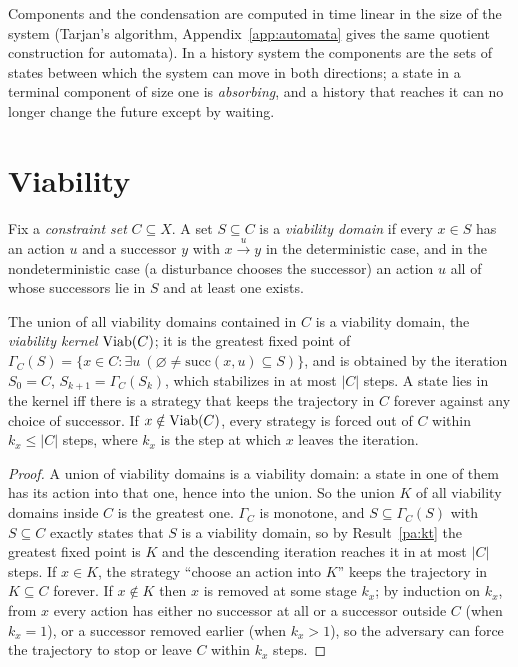 Components and the condensation are computed in time linear in the size of the system (Tarjan's algorithm, Appendix~\ref{app:automata} gives the same quotient construction for automata). In a history system the components are the sets of states between which the system can move in both directions; a state in a terminal component of size one is \emph{absorbing}, and a history that reaches it can no longer change the future except by waiting.

\section{Viability}

Fix a \emph{constraint set} $C\subseteq X$. A set $S\subseteq C$ is a \emph{viability domain} if every $x\in S$ has an action $u$ and a successor $y$ with $x\xrightarrow{u}y$ in the deterministic case, and in the nondeterministic case (a disturbance chooses the successor) an action $u$ all of whose successors lie in $S$ and at least one exists.

\begin{newresult}\label{pr:kernel}
The union of all viability domains contained in $C$ is a viability domain, the \emph{viability kernel} $\operatorname{Viab}(C)$; it is the greatest fixed point of $\Gamma_C(S)=\{x\in C:\exists u\ (\varnothing\ne\mathrm{succ}(x,u)\subseteq S)\}$, and is obtained by the iteration $S_0=C$, $S_{k+1}=\Gamma_C(S_k)$, which stabilizes in at most $|C|$ steps. A state lies in the kernel iff there is a strategy that keeps the trajectory in $C$ forever against any choice of successor. If $x\notin\operatorname{Viab}(C)$, every strategy is forced out of $C$ within $k_x\le|C|$ steps, where $k_x$ is the step at which $x$ leaves the iteration.
\end{newresult}
\begin{proof}
A union of viability domains is a viability domain: a state in one of them has its action into that one, hence into the union. So the union $K$ of all viability domains inside $C$ is the greatest one. $\Gamma_C$ is monotone, and $S\subseteq\Gamma_C(S)$ with $S\subseteq C$ exactly states that $S$ is a viability domain, so by Result~\ref{pa:kt} the greatest fixed point is $K$ and the descending iteration reaches it in at most $|C|$ steps. If $x\in K$, the strategy ``choose an action into $K$'' keeps the trajectory in $K\subseteq C$ forever. If $x\notin K$ then $x$ is removed at some stage $k_x$; by induction on $k_x$, from $x$ every action has either no successor at all or a successor outside $C$ (when $k_x=1$), or a successor removed earlier (when $k_x>1$), so the adversary can force the trajectory to stop or leave $C$ within $k_x$ steps.
\end{proof}

